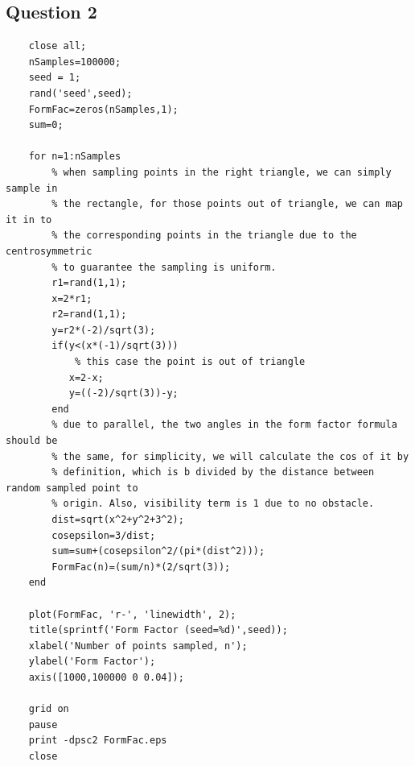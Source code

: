 \documentclass{article}
\begin{document}
\newpage

\subsection*{Question 2}
\begin{verbatim}
    close all;
    nSamples=100000;
    seed = 1;
    rand('seed',seed);
    FormFac=zeros(nSamples,1);
    sum=0;

    for n=1:nSamples
        % when sampling points in the right triangle, we can simply sample in
        % the rectangle, for those points out of triangle, we can map it in to
        % the corresponding points in the triangle due to the centrosymmetric
        % to guarantee the sampling is uniform.
        r1=rand(1,1);
        x=2*r1;
        r2=rand(1,1);
        y=r2*(-2)/sqrt(3);
        if(y<(x*(-1)/sqrt(3)))
            % this case the point is out of triangle
           x=2-x;
           y=((-2)/sqrt(3))-y;
        end
        % due to parallel, the two angles in the form factor formula should be
        % the same, for simplicity, we will calculate the cos of it by
        % definition, which is b divided by the distance between random sampled point to
        % origin. Also, visibility term is 1 due to no obstacle.
        dist=sqrt(x^2+y^2+3^2);
        cosepsilon=3/dist;
        sum=sum+(cosepsilon^2/(pi*(dist^2)));
        FormFac(n)=(sum/n)*(2/sqrt(3));
    end

    plot(FormFac, 'r-', 'linewidth', 2);
    title(sprintf('Form Factor (seed=%d)',seed));
    xlabel('Number of points sampled, n');
    ylabel('Form Factor');
    axis([1000,100000 0 0.04]);

    grid on
    pause
    print -dpsc2 FormFac.eps
    close

\end{verbatim}
\end{document}
